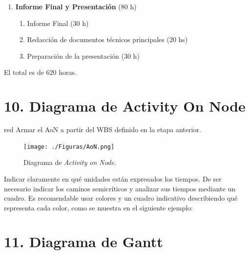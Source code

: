 \documentclass[
11pt, %
codirector, %
]{charter}
\begin{document}
\begin{enumerate}
	\item \textbf{Informe Final y Presentación} (80 h)
	      \begin{enumerate}
		      \item Informe Final (30 h)
		      \item Redacción de documentos técnicos principales (20 hs)
		      \item Preparación de la presentación (30 h)
	      \end{enumerate}

\end{enumerate}


El total es de 620 horas.

\section{10. Diagrama de Activity On Node}
\label{sec:AoN}

\begin{consigna}{red}
	Armar el AoN a partir del WBS definido en la etapa anterior.



\end{consigna}

\begin{figure}[htpb]
	\centering
	\texttt{[image: ./Figuras/AoN.png]}
	\caption{Diagrama de \textit{Activity on Node}.}
	\label{fig:AoN}
\end{figure}

Indicar claramente en qué unidades están expresados los tiempos.
De ser necesario indicar los caminos semicríticos y analizar sus tiempos mediante un cuadro.
Es recomendable usar colores y un cuadro indicativo describiendo qué representa cada color, como se muestra en el siguiente ejemplo:



\section{11. Diagrama de Gantt}
\label{sec:gantt}
\end{document}

